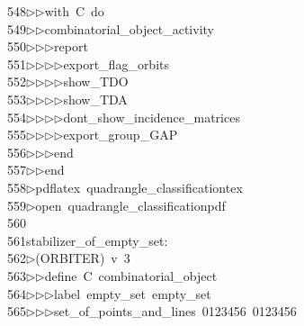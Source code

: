 \begin{tabbing}
548\>$\triangleright$\>$\triangleright$\>with\ C\ do\ \\[0pt]
549\>$\triangleright$\>$\triangleright$\>combinatorial\_object\_activity\ \\[0pt]
550\>$\triangleright$\>$\triangleright$\>$\triangleright$\>report\ \\[0pt]
551\>$\triangleright$\>$\triangleright$\>$\triangleright$\>$\triangleright$\>export\_flag\_orbits\ \\[0pt]
552\>$\triangleright$\>$\triangleright$\>$\triangleright$\>$\triangleright$\>show\_TDO\ \\[0pt]
553\>$\triangleright$\>$\triangleright$\>$\triangleright$\>$\triangleright$\>show\_TDA\ \\[0pt]
554\>$\triangleright$\>$\triangleright$\>$\triangleright$\>$\triangleright$\>dont\_show\_incidence\_matrices\ \\[0pt]
555\>$\triangleright$\>$\triangleright$\>$\triangleright$\>$\triangleright$\>export\_group\_GAP\ \\[0pt]
556\>$\triangleright$\>$\triangleright$\>$\triangleright$\>end\ \\[0pt]
557\>$\triangleright$\>$\triangleright$\>end\\[0pt]
558\>$\triangleright$\>pdflatex\ quadrangle\_classificationtex\\[0pt]
559\>$\triangleright$\>open\ quadrangle\_classificationpdf\\[0pt]
560\>\\[0pt]
561\>stabilizer\_of\_empty\_set:\\[0pt]
562\>$\triangleright$\>(ORBITER)\ v\ 3\ \\[0pt]
563\>$\triangleright$\>$\triangleright$\>define\ C\ combinatorial\_object\ \\[0pt]
564\>$\triangleright$\>$\triangleright$\>$\triangleright$\>label\ empty\_set\ empty\_set\ \\[0pt]
565\>$\triangleright$\>$\triangleright$\>$\triangleright$\>set\_of\_points\_and\_lines\ 0123456\ 0123456\\[0pt]

\end{tabbing}
